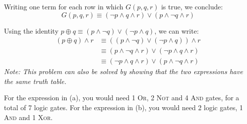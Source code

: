 \documentclass[solution, letterpaper]{cs20}
\begin{document}
\begin{solution}

\subsolution
Writing one term for each row in which $G(p, q, r)$ is true, we conclude:
$$G(p, q, r) \equiv (\lnot p \land q \land r) \lor (p \land \lnot q \land r)$$

\subsolution
Using the identity $p \oplus q \equiv (p \land \lnot q) \lor (\lnot p \land q)$, we can write:
  \begin{align*}
      (p \oplus q) \land r & \equiv ((p \land \lnot q) \lor (\lnot p \land q)) \land r \\
                           & \equiv (p \land \lnot q \land r) \lor (\lnot p \land q \land r) \\
                           & \equiv (\lnot p \land q \land r) \lor (p \land \lnot q \land r)
  \end{align*}
\emph{Note:  This problem can also be solved by showing that the two expressions have the same truth table.}

\subsolution
For the expression in (a), you would need 1 \textsc{Or}, 2 \textsc{Not} and 4 \textsc{And} gates, for a total of 7 logic gates.
For the expression in (b), you would need 2 logic gates, 1 \textsc{And} and 1 \textsc{Xor}.

\end{solution}
\end{document}

